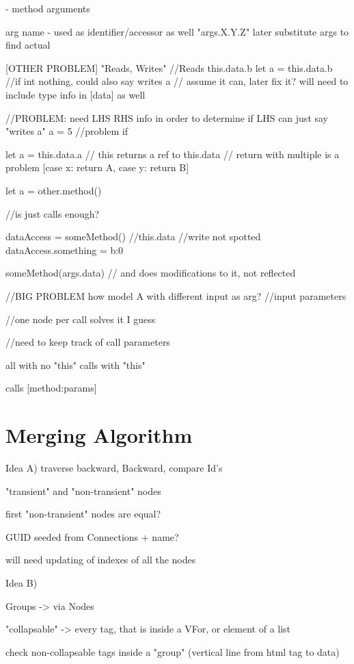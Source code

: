 - method arguments 

arg name - used as identifier/accessor as well
"args.X.Y.Z" later substitute args to find actual 

[OTHER PROBLEM]
"Reads, Writes"
//Reads this.data.b
let a = this.data.b
//if int nothing, could also say writes a
// assume it can, later fix it? will need to include type info in [data] as well

//PROBLEM: need LHS RHS info in order to determine
if LHS can just say "writes a"
a = 5
//problem if

let a = this.data.a
// this returns a ref to this.data
// return with multiple is a problem [case x: return A, case y: return B]

let a = other.method()

//is just calls enough?


dataAccess = someMethod() //this.data 
//write not spotted
dataAccess.something = {b:0}

someMethod(args.data) // and does modifications to it, not reflected 


//BIG PROBLEM how model A with different input as arg?
//input parameters


//one node per call solves it I guess

//need to keep track of call parameters

all with no "this"
calls with "this"

calls [method:params]



\section{Merging Algorithm}

Idea A)
traverse backward,
Backward, compare Id's

"transient" and "non-transient" nodes

first "non-transient" nodes are equal?


GUID seeded from Connections + name?


will need
updating of indexes of all the nodes



Idea B)


Groups -> via Nodes

"collapsable" -> every tag, that is inside a VFor, or element of a list


check non-collapsable tags inside a "group" (vertical line from html tag to data)

